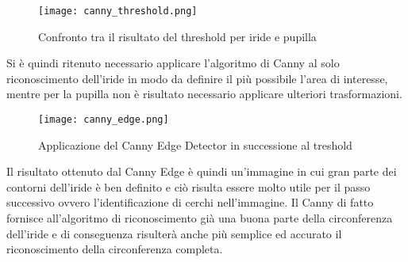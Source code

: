 \begin{figure}[h]
  \centering
  \texttt{[image: canny\_threshold.png]}
  \caption{Confronto tra il risultato del threshold per iride e pupilla}
\end{figure}

Si è quindi ritenuto necessario applicare l’algoritmo di Canny al solo riconoscimento dell’iride in modo da definire il più possibile l’area di interesse, mentre per la pupilla non è risultato necessario applicare ulteriori trasformazioni.

\begin{figure}[h]
  \centering
  \texttt{[image: canny\_edge.png]}
  \caption{Applicazione del Canny Edge Detector in successione al treshold}
\end{figure}

Il risultato ottenuto dal Canny Edge è quindi un’immagine in cui gran parte dei contorni dell’iride è ben definito e ciò risulta essere molto utile per il passo successivo ovvero l’identificazione di cerchi nell’immagine. Il Canny di fatto fornisce all’algoritmo di riconoscimento  già una buona parte della circonferenza dell’iride e di conseguenza risulterà anche più semplice ed accurato il riconoscimento della circonferenza completa.
